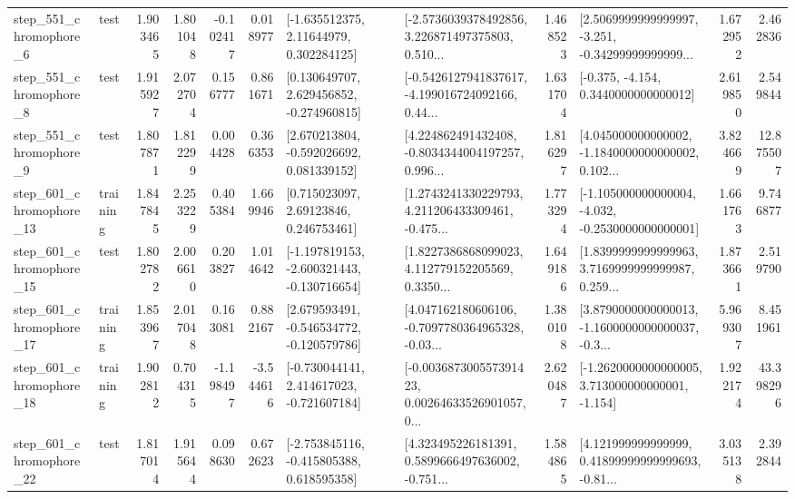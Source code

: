 \begin{tabular}{llrrrrllrlrr}
   step\_551\_chromophore\_6 &      test &      1.903465 &    1.801048 &     -0.102417 &  0.018977 &     [-1.635512375, 2.11644979, 0.302284125] &  [-2.5736039378492856, 3.226871497375803, 0.510... &       1.468523 &  [2.5069999999999997, -3.251, -0.34299999999999... &            1.672952 &          2.462836 \\
   step\_551\_chromophore\_8 &      test &      1.915927 &    2.072704 &      0.156777 &  0.861671 &    [0.130649707, 2.629456852, -0.274960815] &  [-0.5426127941837617, -4.199016724092166, 0.44... &       1.631704 &               [-0.375, -4.154, 0.3440000000000012] &            2.619850 &          2.549844 \\
   step\_551\_chromophore\_9 &      test &      1.807871 &    1.812299 &      0.004428 &  0.366353 &    [2.670213804, -0.592026692, 0.081339152] &  [4.224862491432408, -0.8034344004197257, 0.996... &       1.816297 &  [4.045000000000002, -1.1840000000000002, 0.102... &            3.824669 &         12.875507 \\
  step\_601\_chromophore\_13 &  training &      1.847845 &    2.253229 &      0.405384 &  1.669946 &      [0.715023097, 2.69123846, 0.246753461] &  [1.2743241330229793, 4.211206433309461, -0.475... &       1.773294 &  [-1.105000000000004, -4.032, -0.2530000000000001] &            1.661763 &          9.746877 \\
  step\_601\_chromophore\_15 &      test &      1.802782 &    2.006610 &      0.203827 &  1.014642 &  [-1.197819153, -2.600321443, -0.130716654] &  [1.8227386868099023, 4.112779152205569, 0.3350... &       1.649186 &  [1.8399999999999963, 3.7169999999999987, 0.259... &            1.873661 &          2.519790 \\
  step\_601\_chromophore\_17 &  training &      1.853967 &    2.017048 &      0.163081 &  0.882167 &   [2.679593491, -0.546534772, -0.120579786] &  [4.047162180606106, -0.7097780364965328, -0.03... &       1.380108 &  [3.8790000000000013, -1.1600000000000037, -0.3... &            5.969307 &          8.451961 \\
  step\_601\_chromophore\_18 &  training &      1.902812 &    0.704315 &     -1.198497 & -3.544616 &   [-0.730044141, 2.414617023, -0.721607184] &  [-0.003687300557391423, 0.00264633526901057, 0... &       2.620487 &   [-1.2620000000000005, 3.713000000000001, -1.154] &            1.922174 &         43.398296 \\
  step\_601\_chromophore\_22 &      test &      1.817014 &    1.915644 &      0.098630 &  0.672623 &   [-2.753845116, -0.415805388, 0.618595358] &  [4.323495226181391, 0.5899666497636002, -0.751... &       1.584865 &  [4.121999999999999, 0.41899999999999693, -0.81... &            3.035138 &          2.392844 \\

\end{tabular}

